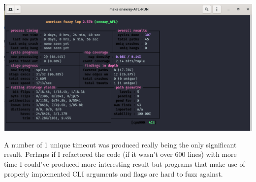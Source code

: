 \documentclass[12pt, letterpaper]{article}
\begin{document}
\begin{sloppypar}
\begin{flushleft}
{\includegraphics[width=1\textwidth]{AFL_test0.jpg}}

A number of 1 unique timeout was produced really being the only significant result. Perhaps
if I refactored the code (if it wasn't over 600 lines) with more time I could've produced
more interesting result but programs that make use of properly implemented CLI arguments
and flags are hard to fuzz against. 


\end{flushleft}
\end{sloppypar}
\end{document}
